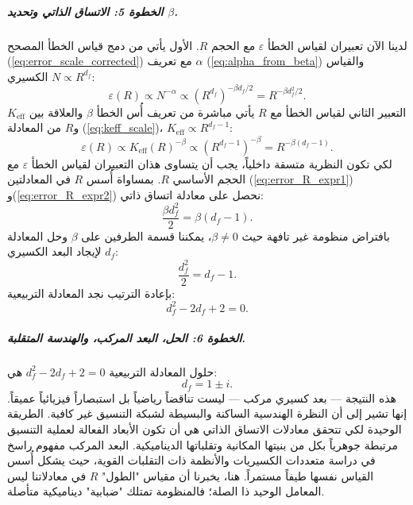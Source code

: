 \documentclass[12pt,a4paper]{article}
\newcommand{\Ke}{K_{\mathrm{eff}}}
\theoremstyle{remark}
\begin{document}
	\subparagraph*{الخطوة 5: الاتساق الذاتي وتحديد \(\beta\).}
	لدينا الآن تعبيران لقياس الخطأ \(\varepsilon\) مع الحجم \(R\). الأول يأتي من دمج قياس الخطأ المصحح (\ref{eq:error_scale_corrected}) مع تعريف \(\alpha\) (\ref{eq:alpha_from_beta}) والقياس الكسيري \(N \propto R^{d_f}\):
	\begin{equation}
		\varepsilon(R) \propto N^{-\alpha} \propto (R^{d_f})^{-\beta d_f/2} = R^{-\beta d_f^2 / 2}.
		\label{eq:error_R_expr1}
	\end{equation}
	التعبير الثاني لقياس الخطأ مع \(R\) يأتي مباشرة من تعريف أُس الخطأ \(\beta\) والعلاقة بين \(\Ke\) و\(R\) من المعادلة (\ref{eq:keff_scale})، \(\Ke \propto R^{d_f-1}\):
	\begin{equation}
		\varepsilon(R) \propto \Ke(R)^{-\beta} \propto (R^{d_f-1})^{-\beta} = R^{-\beta(d_f-1)}.
		\label{eq:error_R_expr2}
	\end{equation}
	لكي تكون النظرية متسقة داخلياً، يجب أن يتساوى هذان التعبيران لقياس الخطأ \(\varepsilon\) مع الحجم الأساسي \(R\). بمساواة أُسس \(R\) في المعادلتين (\ref{eq:error_R_expr1}) و(\ref{eq:error_R_expr2}) نحصل على معادلة اتساق ذاتي:
	\begin{equation}
		\frac{\beta d_f^2}{2} = \beta (d_f - 1).
		\label{eq:consistency}
	\end{equation}
	بافتراض منظومة غير تافهة حيث \(\beta \neq 0\)، يمكننا قسمة الطرفين على \(\beta\) وحل المعادلة لإيجاد البعد الكسيري \(d_f\):
	\begin{equation}
		\frac{d_f^2}{2} = d_f - 1.
	\end{equation}
	بإعادة الترتيب نجد المعادلة التربيعية:
	\begin{equation}
		d_f^2 - 2d_f + 2 = 0.
		\label{eq:quadratic}
	\end{equation}
	
	\subparagraph*{الخطوة 6: الحل، البعد المركب، والهندسة المتقلبة.}
	حلول المعادلة التربيعية \(d_f^2 - 2d_f + 2 = 0\) هي:
	\begin{equation}
		d_f = 1 \pm i.
		\label{eq:df_solution}
	\end{equation}
	هذه النتيجة — بعد كسيري مركب — ليست تناقضاً رياضياً بل استبصاراً فيزيائياً عميقاً. إنها تشير إلى أن النظرة الهندسية الساكنة والبسيطة لشبكة التنسيق غير كافية. الطريقة الوحيدة لكي تتحقق معادلات الاتساق الذاتي هي أن تكون الأبعاد الفعالة لعملية التنسيق مرتبطة جوهرياً بكل من بنيتها المكانية وتقلباتها الديناميكية. البعد المركب مفهوم راسخ في دراسة متعددات الكسيريات والأنظمة ذات التقلبات القوية، حيث يشكل أُسس القياس نفسها طيفاً مستمراً. هنا، يخبرنا أن مقياس "الطول" \(R\) في معادلاتنا ليس المعامل الوحيد ذا الصلة؛ فالمنظومة تمتلك "ضبابية" ديناميكية متأصلة.
	
\end{document}
